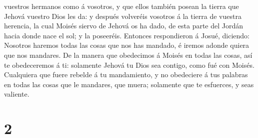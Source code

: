 vuestros hermanos como á vosotros, y que ellos también posean la tierra
que Jehová vuestro Dios les da: y después volveréis vosotros á la tierra
de vuestra herencia, la cual Moisés siervo de Jehová os ha dado, de esta
parte del Jordán hacia donde nace el sol; y la poseeréis.
 Entonces respondieron á Josué, diciendo: Nosotros
haremos todas las cosas que nos has mandado, é iremos adonde quiera que
nos mandares.  De la manera que obedecimos á Moisés en
todas las cosas, así te obedeceremos á ti: solamente Jehová tu Dios sea
contigo, como fué con Moisés.  Cualquiera que fuere
rebelde á tu mandamiento, y no obedeciere á tus palabras en todas las
cosas que le mandares, que muera; solamente que te esfuerces, y seas
valiente.

\hypertarget{section-1}{%
\section{2}\label{section-1}}


